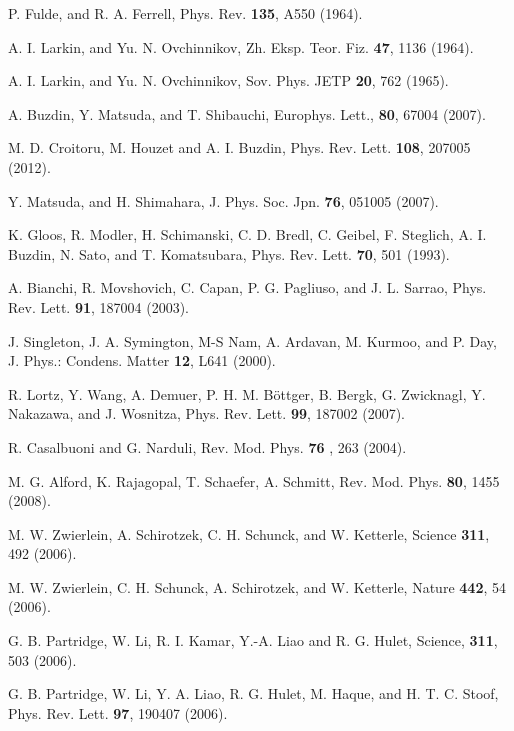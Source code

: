 \documentclass[prl,showpacs,twocolumn]{revtex4}
\begin{document}
\begin{thebibliography}{99}
 P. Fulde, and R. A. Ferrell, Phys. Rev. \textbf{135},
A550 (1964).

 A. I. Larkin, and Yu. N. Ovchinnikov, Zh. Eksp. Teor.
Fiz. \textbf{47}, 1136 (1964).

 A. I. Larkin, and Yu. N. Ovchinnikov, Sov. Phys. JETP
\textbf{20}, 762 (1965).

 A. Buzdin, Y. Matsuda, and T. Shibauchi, Europhys. Lett.,
\textbf{80}, 67004 (2007).

 M. D. Croitoru, M. Houzet and A. I. Buzdin, Phys. Rev.
Lett. \textbf{108}, 207005 (2012).

 Y. Matsuda, and H. Shimahara, J. Phys. Soc. Jpn. \textbf{76},
051005 (2007).

 K. Gloos, R. Modler, H. Schimanski, C. D. Bredl, C. Geibel,
F. Steglich, A. I. Buzdin, N. Sato, and T. Komatsubara, Phys. Rev. Lett.
\textbf{70}, 501 (1993).

 A. Bianchi, R. Movshovich, C. Capan, P. G. Pagliuso, and
J. L. Sarrao, Phys. Rev. Lett. \textbf{91}, 187004 (2003).

 J. Singleton, J. A. Symington, M-S Nam, A. Ardavan, M.
Kurmoo, and P. Day, J. Phys.: Condens. Matter \textbf{12}, L641 (2000).

 R. Lortz, Y. Wang, A. Demuer, P. H. M. B\"ottger, B. Bergk,
G. Zwicknagl, Y. Nakazawa, and J. Wosnitza, Phys. Rev. Lett. \textbf{99},
187002 (2007).

 R. Casalbuoni and G. Narduli, Rev. Mod. Phys. \textbf{76%
}, 263 (2004).

 M. G. Alford, K. Rajagopal, T. Schaefer, A. Schmitt, Rev.
Mod. Phys. \textbf{80}, 1455 (2008).

 M. W. Zwierlein, A. Schirotzek, C. H. Schunck, and W.
Ketterle, Science \textbf{311}, 492 (2006).

 M. W. Zwierlein, C. H. Schunck, A. Schirotzek, and W.
Ketterle, Nature \textbf{442}, 54 (2006).

 G. B. Partridge, W. Li, R. I. Kamar, Y.-A. Liao and R. G.
Hulet, Science, \textbf{311}, 503 (2006).

 G. B. Partridge, W. Li, Y. A. Liao, R. G. Hulet, M. Haque,
and H. T. C. Stoof, Phys. Rev. Lett. \textbf{97}, 190407 (2006).


\end{thebibliography}
\end{document}
